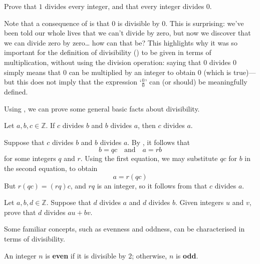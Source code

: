 \begin{exercise}
\label{exOneDividesEveryIntegerDividesZero}
Prove that $1$ divides every integer, and that every integer divides $0$.
\end{exercise}

Note that a consequence of  is that $0$ is divisible by $0$. This is surprising: we've been told our whole lives that we can't divide by zero, but now we discover that we can divide zero by zero\dots{} how can that be? This highlights why it was so important for the definition of divisibility () to be given in terms of multiplication, without using the division operation: saying that $0$ divides $0$ simply means that $0$ can be multiplied by an integer to obtain $0$ (which is true)---but this does not imply that the expression `$\frac{0}{0}$' can (or should) be meaningfully defined.

Using , we can prove some general basic facts about divisibility.

\begin{proposition}
\label{propDivisibilityIsTransitive}
Let $a,b,c \in \mathbb{Z}$. If $c$ divides $b$ and $b$ divides $a$, then $c$ divides $a$.
\end{proposition}

\begin{cproof}
Suppose that $c$ divides $b$ and $b$ divides $a$. By , it follows that
\[ b=qc \quad \text{and} \quad a=rb \]
for some integers $q$ and $r$. Using the first equation, we may substitute $qc$ for $b$ in the second equation, to obtain
\[ a=r(qc) \]
But $r(qc) = (rq)c$, and $rq$ is an integer, so it follows from  that $c$ divides $a$.
\end{cproof}


\begin{exercise}
\label{exDivisibilityIsLinear}
Let $a,b,d \in \mathbb{Z}$. Suppose that $d$ divides $a$ and $d$ divides $b$. Given integers $u$ and $v$, prove that $d$ divides $au+bv$.
\end{exercise}

Some familiar concepts, such as evenness and oddness, can be characterised in terms of divisibility.

\begin{definition}
\label{defEvenOdd}
An integer $n$ is \textbf{even} if it is divisible by $2$; otherwise, $n$ is \textbf{odd}.
\end{definition}

